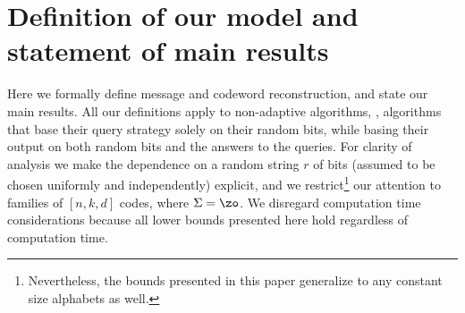 \section{Definition of our model and statement of main results}\label{sec:recdef}
Here we formally define message and codeword reconstruction, and state our main results. All our definitions apply to non-adaptive algorithms, \ie, algorithms that base their query strategy solely on their random bits, while basing their output on both random bits and the answers to the queries. For clarity of analysis we make the dependence on a random string $r$ of bits (assumed to be chosen uniformly and independently) explicit, and we restrict\footnote{Nevertheless, the bounds presented in this paper generalize to any constant size alphabets as well.} our attention to families of $[n,k,d]$ codes, where $\Sigma = \zo$. We disregard computation time considerations because all lower bounds presented here hold regardless of computation time.

